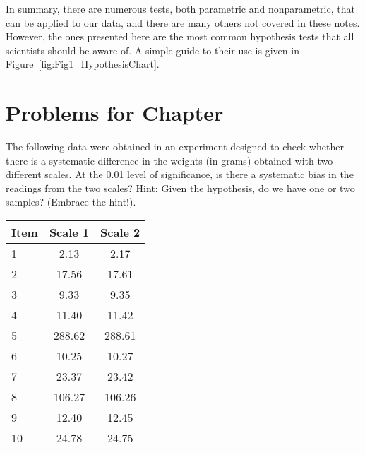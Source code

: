 
In summary, there are numerous tests, both parametric and nonparametric, that can be applied to our data,
and there are many others not covered in these notes.  However, the ones presented here are the most common
hypothesis tests that all scientists should be aware of.  A simple guide to their use is given in Figure~\ref{fig:Fig1_HypothesisChart}.

\clearpage
\section{Problems for Chapter \thechapter}

\begin{problem}
The following data were obtained in an experiment designed to check whether there is a systematic difference
in the weights (in grams) obtained with two different scales.
At the 0.01 level of significance, is there a systematic bias in the readings from the two scales?
Hint: Given the hypothesis, do we have one or two samples? (Embrace the hint!).
\begin{table}[H]
\centering
\begin{tabular}{|l||c|c|} \hline
\bf{Item} & \bf{Scale 1} & \bf{Scale 2} \\ \hline
1  & 2.13	& 2.17 \\ \hline
2  & 17.56	& 17.61 \\ \hline
3  & 9.33	& 9.35 \\ \hline
4  & 11.40	& 11.42 \\ \hline
5  & 288.62	& 288.61 \\ \hline
6  & 10.25	& 10.27 \\ \hline
7  & 23.37	& 23.42 \\ \hline
8  & 106.27	& 106.26 \\ \hline
9  & 12.40	& 12.45 \\ \hline
10 & 24.78      & 24.75 \\ \hline
\end{tabular}
\end{table}
\end{problem}

